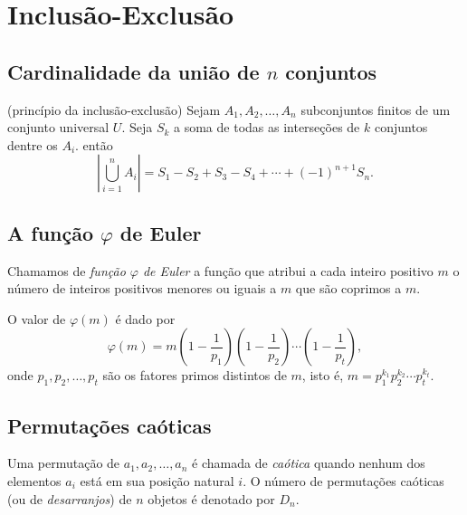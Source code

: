 \documentclass{article}
\begin{document}
\section{Inclusão-Exclusão}

\subsection{Cardinalidade da união de \(n\) conjuntos}

\begin{thm} (princípio da inclusão-exclusão)
    Sejam \(A_1, A_2, \ldots, A_n\) subconjuntos finitos de um conjunto universal \(U\). Seja \(S_k\) a soma de todas as interseções de \(k\) conjuntos dentre os \(A_i\). então
    \begin{equation}
        \left| \bigcup_{i=1}^{n} A_i \right| = S_1 - S_2 + S_3 - S_4 + \cdots + (-1)^{n+1} S_n.
    \end{equation}
\end{thm}

\subsection{A função \(\varphi\) de Euler}

\begin{defn}
    Chamamos de \emph{função \(\varphi\) de Euler} a função que atribui a cada inteiro positivo \(m\) o número de inteiros positivos menores ou iguais a \(m\) que são coprimos a \(m\).
\end{defn}

\begin{thm}
    O valor de \(\varphi(m)\) é dado por
    \begin{equation}
        \varphi(m) = m \left( 1 - \frac{1}{p_1} \right) \left( 1 - \frac{1}{p_2} \right) \cdots \left( 1 - \frac{1}{p_t} \right),
    \end{equation}
    \noindent onde \(p_1, p_2, \ldots, p_t\) são os fatores primos distintos de \(m\), isto é, \(m = p_1^{k_1} p_2^{k_2} \cdots p_t^{k_t}\).
\end{thm}

\subsection{Permutações caóticas}

\begin{defn}
    Uma permutação de \(a_1, a_2, \ldots, a_n\) é chamada de \emph{caótica} quando nenhum dos elementos \(a_i\) está em sua posição natural \(i\). O número de permutações caóticas (ou de \emph{desarranjos}) de \(n\) objetos é denotado por \(D_n\).
\end{defn}
\end{document}

